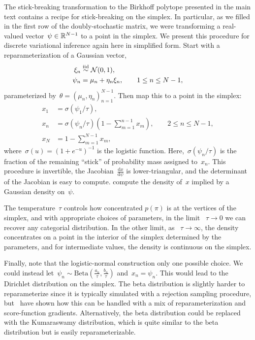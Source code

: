 \documentclass[twoside]{article}
\begin{document}
The stick-breaking transformation to the Birkhoff polytope presented
in the main text contains a recipe for stick-breaking on the simplex.
In particular, as we filled in the first row of the doubly-stochastic
matrix, we were transforming a real-valued vector~$\psi \in \mathbb{R}^{N-1}$
to a point in the simplex.  We present this procedure for
discrete variational inference again here in simplified form.
Start with a reparameterization of a Gaussian vector,
\begin{align*}
  \xi_n &\stackrel{\text{iid}}{\sim} \mathcal{N}(0, 1), \\
  \psi_n & = \mu_n + \eta_n \xi_n, \qquad 1 \leq n \leq N-1,
\end{align*}
parameterized by~${\theta = (\mu_n, \eta_n)_{n=1}^{N-1}}$. 
Then map this to a point in the simplex:
\begin{align*}
  x_1 &= \sigma(\psi_1 / \tau), \\
  x_n &= \sigma(\psi_n / \tau) \left(1- \sum_{m=1}^{n-1} x_m\right), \qquad 2 \leq n \leq N-1,  \\
  x_N &= 1- \sum_{m=1}^{N-1} x_m,
\end{align*}
where~${\sigma(u) = (1+e^{-u})^{-1}}$ is the logistic
function. Here,~$\sigma(\psi_n/\tau)$ is the fraction of the remaining
``stick'' of probability mass assigned to~$x_n$.  This procedure is
invertible, the Jacobian~$\frac{\mathrm{d}x}{\mathrm{d}\psi}$ is
lower-triangular, and the determinant of the Jacobian is easy to
compute.  \citet{linderman2015dependent} compute the density of~$x$
implied by a Gaussian density on~$\psi$.

The temperature~$\tau$ controls how concentrated $p(\pi)$ is at the
vertices of the simplex, and with appropriate choices of parameters,
in the limit ~$\tau \to 0$ we can recover any categorial
distribution. In the other limit, as ~$\tau \to \infty$, the density
concentrates on a point in the interior of the simplex determined by
the parameters, and for intermediate values, the density is continuous
on the simplex.

Finally, note that the logistic-normal construction only one possible
choice.  We could instead
let~${\psi_n \sim \mathrm{Beta}(\tfrac{a_n}{\tau}, \tfrac{b_n}{\tau})}$
and~${x_n = \psi_n}$. This would lead to the Dirichlet distribution on
the simplex.  The beta distribution is slightly harder to
reparameterize since it is typically simulated with a rejection
sampling procedure, but~\citet{naesseth2017reparameterization} have
shown how this can be handled with a mix of reparameterization and
score-function gradients.  Alternatively, the beta distribution could
be replaced with the Kumaraswamy distribution, which is quite similar
to the beta distribution but is easily reparameterizable.
\end{document}
